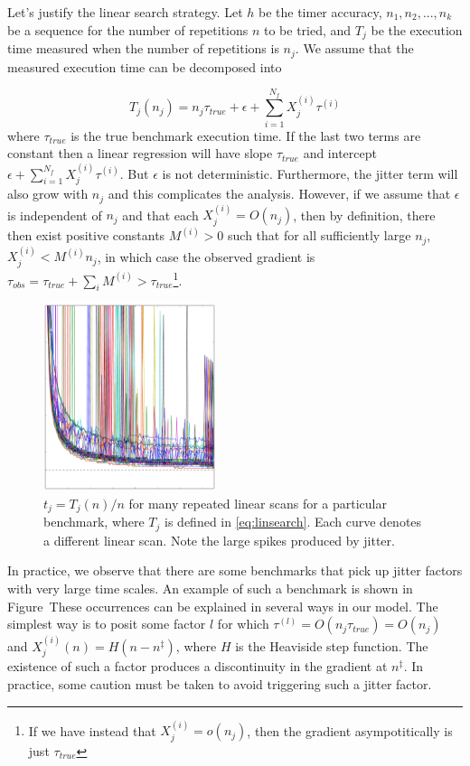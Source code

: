 \documentclass[conference]{IEEEtran}
\begin{document}
Let's justify the linear search strategy. Let $h$ be the timer accuracy, $n_1, n_2, ..., n_k$ be a sequence for the number of repetitions $n$ to be tried, and $T_j$ be the execution time measured when the number of repetitions is $n_j$. We assume that the measured execution time can be decomposed into

\begin{equation}
    \label{eq:linsearch}
    T_j(n_j) = n_j \tau_{true} + \epsilon + \sum_{i=1}^{N_f} X_j^{(i)} \tau^{(i)}
\end{equation}
%
where $\tau_{true}$ is the true benchmark execution time. If the last two terms
are constant then a linear regression will have slope $\tau_{true}$ and intercept $\epsilon + \sum_{i=1}^{N_f} X_j^{(i)} \tau^{(i)}$. But $\epsilon$ is not deterministic. Furthermore, the jitter term will also grow with $n_j$ and this complicates the analysis.
However, if we assume that $\epsilon$ is independent of $n_j$ and that each $X_j^{(i)} = O(n_j)$, then by definition, there then exist positive constants $M^{(i)} > 0$ such that for all sufficiently large $n_j$, $X_j^{(i)} < M^{(i)} n_j$, in which case the observed gradient is $\tau_{obs} = \tau_{true} + \sum_i M^{(i)} > \tau_{true}$\footnote{If we have instead that $X_j^{(i)} = o(n_j)$, then the gradient asympotitically is just $\tau_{true}$}.

\begin{figure}
\centering
\includegraphics[width=0.45\textwidth]{figures/fig2/linear_scan_branchsum_no_recurse}
\caption{$t_j = T_j(n)/n$ for many repeated linear scans for a particular benchmark, where $T_j$ is defined in \eqref{eq:linsearch}. Each curve denotes a different linear scan. Note the large spikes produced by jitter.}
\label{fig:scaling}
\end{figure}

In practice, we observe that there are some benchmarks that pick up jitter factors with very large time scales. An example of such a benchmark is shown in Figure~These occurrences can be explained in several ways in our model. The simplest way is to posit some factor $l$ for which $\tau^{(l)} = O(n_j \tau_{true}) = O(n_j)$ and $X_j^{(i)}(n) = H(n - n^\ddagger)$,
where $H$ is the Heaviside step function. The existence of such a factor produces a discontinuity in the gradient at $n^\ddagger$. In practice, some caution must be taken to avoid triggering such a jitter factor.
\end{document}
